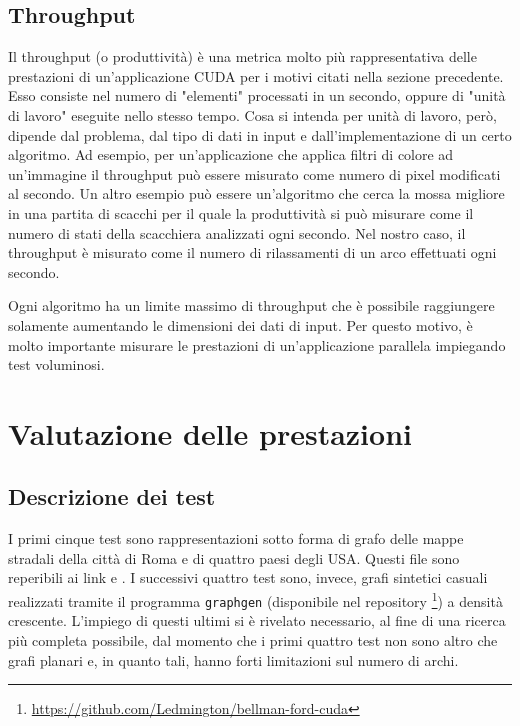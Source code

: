 \documentclass[12pt,a4paper,oneside]{book}
\begin{document}
	\section{Throughput}
	Il throughput (o produttività) è una metrica molto più rappresentativa delle prestazioni di un'applicazione CUDA per i motivi citati nella sezione precedente. Esso consiste nel numero di "elementi" processati in un secondo, oppure di "unità di lavoro" eseguite nello stesso tempo. Cosa si intenda per unità di lavoro, però, dipende dal problema, dal tipo di dati in input e dall'implementazione di un certo algoritmo. Ad esempio, per un'applicazione che applica filtri di colore ad un'immagine il throughput può essere misurato come numero di pixel modificati al secondo. Un altro esempio può essere un'algoritmo che cerca la mossa migliore in una partita di scacchi per il quale la produttività si può misurare come il numero di stati della scacchiera analizzati ogni secondo. Nel nostro caso, il throughput è misurato come il numero di rilassamenti di un arco effettuati ogni secondo.
	
	Ogni algoritmo ha un limite massimo di throughput che è possibile raggiungere solamente aumentando le dimensioni dei dati di input. Per questo motivo, è molto importante misurare le prestazioni di un'applicazione parallela impiegando test voluminosi.
	
	\chapter{Valutazione delle prestazioni}
	\label{chap:perf}
	\section{Descrizione dei test}
	I primi cinque test sono rappresentazioni sotto forma di grafo delle mappe stradali della città di Roma e di quattro paesi degli USA. Questi file sono reperibili ai link \cite{testUSA} e \cite{testRoma}. I successivi quattro test sono, invece, grafi sintetici casuali realizzati tramite il programma \texttt{graphgen} (disponibile nel repository \footnote{\url{https://github.com/Ledmington/bellman-ford-cuda}}) a densità crescente. L'impiego di questi ultimi si è rivelato necessario, al fine di una ricerca più completa possibile, dal momento che i primi quattro test non sono altro che grafi planari e, in quanto tali, hanno forti limitazioni sul numero di archi.
	
\end{document}
